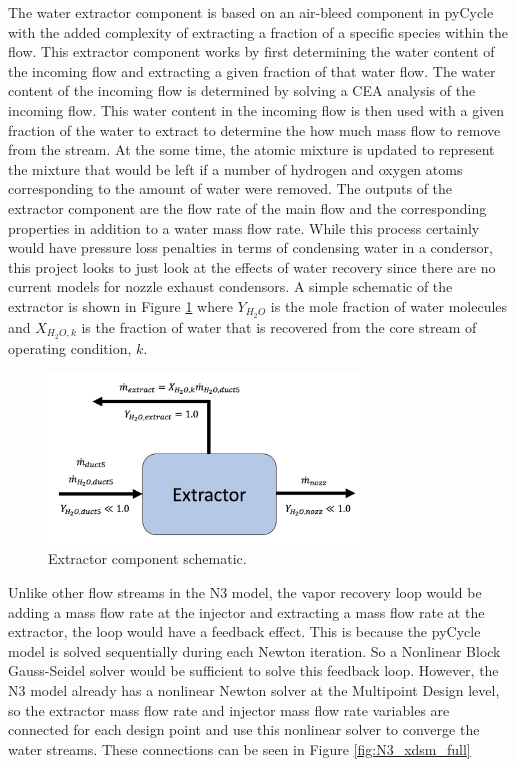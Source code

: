 \documentclass[12pt]{new-aiaa}
\begin{document}
\noindent
The water extractor component is based on an air-bleed component in pyCycle with the added complexity of extracting a fraction of a specific species within the flow.
This extractor component works by first determining the water content of the incoming flow and extracting a given fraction of that water flow.
The water content of the incoming flow is determined by solving a CEA analysis of the incoming flow.
This water content in the incoming flow is then used with a given fraction of the water to extract to determine the how much mass flow to remove from the stream.
At the some time, the atomic mixture is updated to represent the mixture that would be left if a number of hydrogen and oxygen atoms corresponding to the amount of water were removed.
The outputs of the extractor component are the flow rate of the main flow and the corresponding properties in addition to a water mass flow rate.
While this process certainly would have pressure loss penalties in terms of condensing water in a condersor, this project looks to just look at the effects of water recovery since there are no current models for nozzle exhaust condensors.
A simple schematic of the extractor is shown in Figure \ref{fig:extractor} where $Y_{H_2O}$ is the mole fraction of water molecules and $X_{H_2O,k}$ is the fraction of water that is recovered from the core stream of operating condition, $k$.

\begin{figure}[!hbt]
    \centering
    \includegraphics[width=0.75\textwidth]{extractor.png}
    \caption{Extractor component schematic.}
    \label{fig:extractor}
\end{figure}

\noindent
Unlike other flow streams in the N3 model, the vapor recovery loop would be adding a mass flow rate at the injector and extracting a mass flow rate at the extractor, the loop would have a feedback effect.
This is because the pyCycle model is solved sequentially during each Newton iteration.
So a Nonlinear Block Gauss-Seidel solver would be sufficient to solve this feedback loop.
However, the N3 model already has a nonlinear Newton solver at the Multipoint Design level, so the extractor mass flow rate and injector mass flow rate variables are connected for each design point and use this nonlinear solver to converge the water streams.
These connections can be seen in Figure \ref{fig:N3_xdsm_full}
\end{document}
